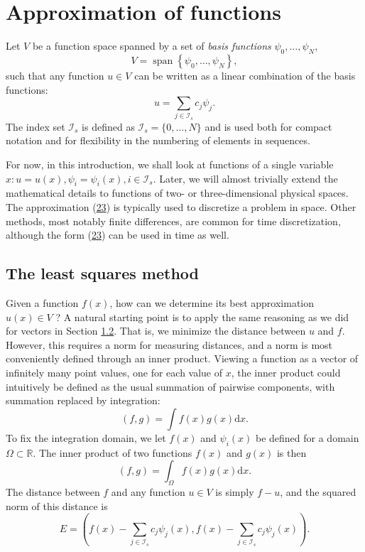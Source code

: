 \documentclass[../main.tex]{subfiles}
\begin{document}
	\chapter{Approximation of functions}
	\label{chap:chap_2}
	Let $V$ be a function space spanned by a set of \textit{basis functions} $\psi_{0}, \ldots, \psi_{N}$,
	$$
	V=\operatorname{span}\left\{\psi_{0}, \ldots, \psi_{N}\right\},
	$$
	such that any function $u \in V$ can be written as a linear combination of the basis functions:
	\begin{equation}\label{eqa23}
		u=\sum_{j \in \mathcal{I}_{s}} c_{j} \psi_{j}.
	\end{equation}
	The index set $\mathcal{I}_{s}$ is defined as $\mathcal{I}_{s}=\{0, \ldots, N\}$ and is used both for compact notation and for flexibility in the numbering of elements in sequences.
	
	For now, in this introduction, we shall look at functions of a single variable $x: u=u(x), \psi_{i}=\psi_{i}(x), i \in \mathcal{I}_{s}$. Later, we will almost trivially extend the mathematical details to functions of two- or three-dimensional physical spaces.
	The approximation (\hyperref[eqa23]{23}) is typically used to discretize a problem in space. Other
	methods, most notably finite differences, are common for time discretization,
	although the form (\hyperref[eqa23]{23}) can be used in time as well.
	\section[The least squares method]{The least squares method}
	\label{sec:sec_2_1}
	
	\noindent Given a function $f(x)$, how can we determine its best approximation $u(x) \in V$ ? A natural starting point is to apply the same reasoning as we did for vectors in Section \hyperref[sec:sec_1_2]{1.2}. That is, we minimize the distance between $u$ and $f$. However, this requires a norm for measuring distances, and a norm is most conveniently defined through an inner product. Viewing a function as a vector of infinitely many point values, one for each value of $x$, the inner product could intuitively be defined as the usual summation of pairwise components, with summation replaced by integration:
	$$
	(f, g)=\int f(x) g(x) \mathrm{d} x.
	$$
	To fix the integration domain, we let $f(x)$ and $\psi_{i}(x)$ be defined for a domain $\Omega \subset \mathbb{R}$. The inner product of two functions $f(x)$ and $g(x)$ is then
	\begin{equation}\label{eqa24}
		(f, g)=\int_{\Omega} f(x) g(x) \mathrm{d} x.	
	\end{equation}
	The distance between $f$ and any function $u \in V$ is simply $f-u$, and the squared norm of this distance is
	\begin{equation}\label{eqa25}
		E=\left(f(x)-\sum_{j \in \mathcal{I}_{s}} c_{j} \psi_{j}(x), f(x)-\sum_{j \in \mathcal{I}_{s}} c_{j} \psi_{j}(x)\right).	
	\end{equation}
	
\end{document}

